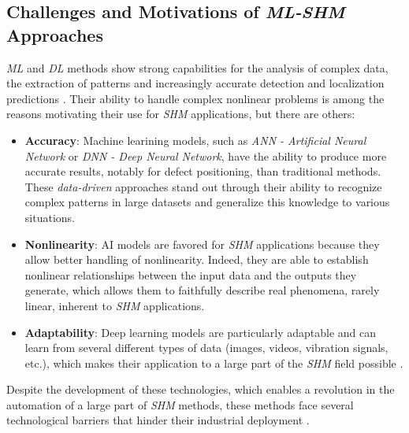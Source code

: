 \documentclass[12pt]{article}
\begin{document}
\subsection{Challenges and Motivations of \textit{ML-SHM} Approaches}
 
\textit{ML} and \textit{DL} methods show strong capabilities for the analysis of complex data, the extraction of patterns and increasingly accurate detection and localization predictions \cite{Khatir2025}. Their ability to handle complex nonlinear problems is among the reasons motivating their use for \textit{SHM} applications, but there are others:
 
\begin{itemize}[itemsep=8pt]
    
    \item \textbf{Accuracy}: Machine learining models, such as \textit{ANN -  Artificial Neural Network} or \textit{DNN - Deep Neural Network}, have the ability to produce more accurate results, notably for defect positioning, than traditional methods. These \textit{data-driven} approaches stand out through their ability to recognize complex patterns in large datasets and generalize this knowledge to various situations.
    
    \item \textbf{Nonlinearity}: AI models are favored for \textit{SHM} applications because they allow better handling of nonlinearity. Indeed, they are able to establish nonlinear relationships between the input data and the outputs they generate, which allows them to faithfully describe real phenomena, rarely linear, inherent to \textit{SHM} applications. 
    
    \item \textbf{Adaptability}: Deep learning models are particularly adaptable and can learn from several different types of data (images, videos, vibration signals, etc.), which makes their application to a large part of the \textit{SHM} field possible \cite{Khatir2025}.
    
\end{itemize}
 
Despite the development of these technologies, which enables a revolution in the automation of a large part of \textit{SHM} methods, these methods face several technological barriers that hinder their industrial deployment \cite{Khatir2025, SPENCER2025100203}.
 
\end{document}
